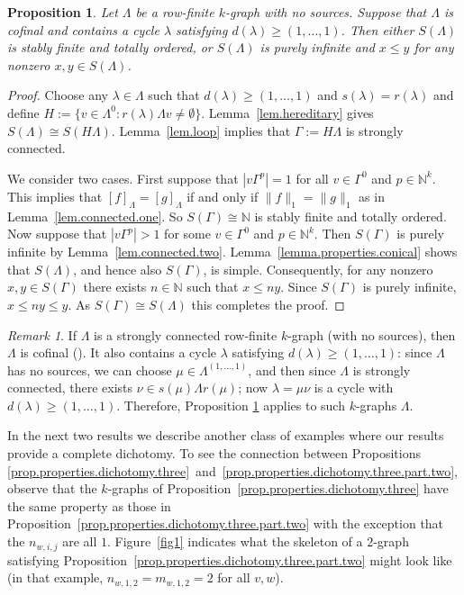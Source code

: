 \documentclass[a4paper, 12pt]{amsart}
\numberwithin{equation}{section}
\newcounter{theorem}
\newtheorem{prop}[theorem]{Proposition}
\theoremstyle{remark}
\newtheorem{remark}[theorem]{Remark}
\theoremstyle{definition}
\begin{document}
\begin{prop}\label{prop.properties.dichotomy.merged}
Let $\Lambda$ be a row-finite $k$-graph with no sources. Suppose that $\Lambda$ is
cofinal and contains a cycle $\lambda$ satisfying $d(\lambda)\geq (1,\dots,1)$. Then
either $S(\Lambda)$ is stably finite and totally ordered, or $S(\Lambda)$ is  purely
infinite and $x\leq y$ for any nonzero $x,y\in S(\Lambda)$.
\end{prop}
\begin{proof}
Choose any $\lambda\in \Lambda$ such that $d(\lambda)\geq (1,\dots,1)$ and
$s(\lambda)=r(\lambda)$ and define $H:=\{v\in \Lambda^0: r(\lambda)\Lambda v\neq
\emptyset\}$. Lemma~\ref{lem.hereditary} gives $S(\Lambda)\cong S(H\Lambda)$.
Lemma~\ref{lem.loop} implies that  $\Gamma:=H\Lambda$ is strongly connected.

We consider two cases. First suppose that $|v\Gamma^p|=1$ for all $v\in \Gamma^0$ and
$p\in {\mathbb{N}}^k$. This implies that ${{[{f}]_\Lambda}}={{[{g}]_\Lambda}}$ if and only if $\|f\|_1=\|g\|_1$ as in
Lemma~\ref{lem.connected.one}. So $S(\Gamma)\cong {\mathbb{N}}$ is stably finite and totally
ordered. Now suppose that $|v\Gamma^p|>1$ for some $v\in \Gamma^0$ and $p\in
{\mathbb{N}}^k$. Then $S(\Gamma)$ is purely infinite by Lemma~\ref{lem.connected.two}.
Lemma~\ref{lemma.properties.conical} shows that $S(\Lambda)$, and hence also $S(\Gamma)$,
is simple. Consequently, for any nonzero $x,y\in S(\Gamma)$ there exists $n\in {\mathbb{N}}$ such
that $x\leq ny$. Since $S(\Gamma)$ is purely infinite, $x\leq  ny\leq y$. As
$S(\Gamma)\cong S(\Lambda)$ this completes the proof.
\end{proof}

\begin{remark}
If $\Lambda$ is a strongly connected row-finite $k$-graph (with no sources), then
$\Lambda$ is cofinal (\cite[Proposition~4.5]{MR3444442}). It also contains a cycle
$\lambda$ satisfying $d(\lambda)\geq (1,\dots,1)$: since $\Lambda$ has no sources, we can
choose $\mu \in \Lambda^{(1, \dots, 1)}$, and then since $\Lambda$ is strongly connected,
there exists $\nu \in s(\mu)\Lambda r(\mu)$; now $\lambda = \mu\nu$ is a cycle with
$d(\lambda) \ge (1, \dots, 1)$. Therefore, Proposition
\ref{prop.properties.dichotomy.merged} applies to such $k$-graphs $\Lambda$.
\end{remark}

In the next two results we describe another class of examples where our results provide a
complete dichotomy. To see the connection between Propositions
\ref{prop.properties.dichotomy.three}~and~\ref{prop.properties.dichotomy.three.part.two},
observe that the $k$-graphs of Proposition~\ref{prop.properties.dichotomy.three} have the
same property as those in Proposition~\ref{prop.properties.dichotomy.three.part.two} with
the exception that the $n_{w,i,j}$ are all $1$. Figure~\ref{fig1} indicates what the
skeleton of a $2$-graph satisfying
Proposition~\ref{prop.properties.dichotomy.three.part.two} might look like (in that
example, $n_{w,1,2} = m_{w,1,2} = 2$ for all $v,w$).
\end{document}
